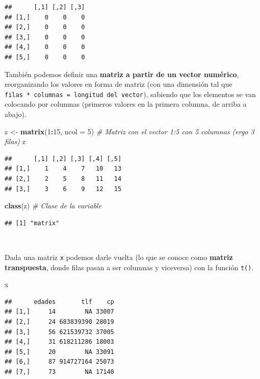 \documentclass[11pt,]{book}
\newenvironment{Shaded}{\begin{snugshade}}{\end{snugshade}}
\newcommand{\CommentTok}[1]{\textcolor[rgb]{0.37,0.37,0.37}{\textit{#1}}}
\newcommand{\DataTypeTok}[1]{\textcolor[rgb]{0.27,0.27,0.27}{#1}}
\newcommand{\DecValTok}[1]{\textcolor[rgb]{0.06,0.06,0.06}{#1}}
\newcommand{\KeywordTok}[1]{\textcolor[rgb]{0.27,0.27,0.27}{\textbf{#1}}}
\newcommand{\NormalTok}[1]{#1}
\newcommand{\OperatorTok}[1]{\textcolor[rgb]{0.43,0.43,0.43}{\textbf{#1}}}
\newcommand{\StringTok}[1]{\textcolor[rgb]{0.5,0.5,0.5}{#1}}
\begin{document}
\begin{verbatim}
##      [,1] [,2] [,3]
## [1,]    0    0    0
## [2,]    0    0    0
## [3,]    0    0    0
## [4,]    0    0    0
## [5,]    0    0    0
\end{verbatim}

También podemos definir una \textbf{matriz a partir de un vector numérico}, reorganizando los valores en forma de matriz (con una dimensión tal que \texttt{filas\ *\ columnas\ =\ longitud\ del\ vector}), sabiendo que los elementos se van colocando por columnas (primeros valores en la primera columna, de arriba a abajo).

\begin{Shaded}
\begin{Highlighting}[]
\NormalTok{z <-}\StringTok{ }\KeywordTok{matrix}\NormalTok{(}\DecValTok{1}\OperatorTok{:}\DecValTok{15}\NormalTok{, }\DataTypeTok{ncol =} \DecValTok{5}\NormalTok{) }\CommentTok{# Matriz con el vector 1:5 con 5 columnas (ergo 3 filas)}
\NormalTok{z}
\end{Highlighting}
\end{Shaded}

\begin{verbatim}
##      [,1] [,2] [,3] [,4] [,5]
## [1,]    1    4    7   10   13
## [2,]    2    5    8   11   14
## [3,]    3    6    9   12   15
\end{verbatim}

\begin{Shaded}
\begin{Highlighting}[]
\KeywordTok{class}\NormalTok{(z) }\CommentTok{# Clase de la variable}
\end{Highlighting}
\end{Shaded}

\begin{verbatim}
## [1] "matrix"
\end{verbatim}

~

Dada una matriz \texttt{x} podemos darle vuelta (lo que se conoce como \textbf{matriz transpuesta}, donde filas pasan a ser columnas y viceversa) con la función \texttt{t()}.

\begin{Shaded}
\begin{Highlighting}[]
\NormalTok{x}
\end{Highlighting}
\end{Shaded}

\begin{verbatim}
##      edades       tlf    cp
## [1,]     14        NA 33007
## [2,]     24 683839390 28019
## [3,]     56 621539732 37005
## [4,]     31 618211286 18003
## [5,]     20        NA 33091
## [6,]     87 914727164 25073
## [7,]     73        NA 17140
\end{verbatim}
\end{document}
